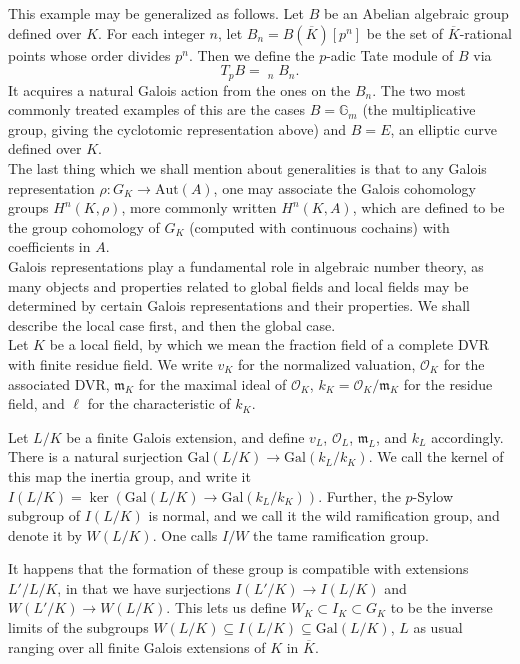 \documentclass[12pt]{article}
\newcommand{\Aut}{\mathrm{Aut}}
\newcommand{\calO}{\mathcal{O}}
\newcommand{\cn}{\colon}
\newcommand{\fkm}{\mathfrak{m}}
\newcommand{\Gal}{\mathrm{Gal}}
\newcommand{\ov}[1]{\overline{#1}}
\newcommand{\liminv}{\mathop{\lim_{\longleftarrow}}}
\begin{document}
This example may be generalized as follows.  Let $B$ be an Abelian algebraic group defined over $K$.  For each integer $n$, let $B_n = B(\ov{K})[p^n]$ be the set of $\ov{K}$-rational points whose order divides $p^n$.  Then we define the $p$-adic Tate module of $B$ via
\[
T_pB = \liminv_n B_n.
\]
It acquires a natural Galois action from the ones on the $B_n$.  The two most commonly treated examples of this are the cases $B = \mathbb{G}_m$ (the multiplicative group, giving the cyclotomic representation above) and $B = E$, an elliptic curve defined over $K$.\\


The last thing which we shall mention about generalities is that to any Galois representation $\rho \cn G_K \to \Aut(A)$, one may associate the Galois cohomology groups $H^n(K,\rho)$, more commonly written $H^n(K,A)$, which are defined to be the group cohomology of $G_K$ (computed with continuous cochains) with coefficients in $A$.\\


Galois representations play a fundamental role in algebraic number theory, as many objects and properties related to global fields and local fields may be determined by certain Galois representations and their properties.  We shall describe the local case first, and then the global case.\\


Let $K$ be a local field, by which we mean the fraction field of a complete DVR with finite residue field.  We write $v_K$ for the normalized valuation, $\calO_K$ for the associated DVR, $\fkm_K$ for the maximal ideal of $\calO_K$, $k_K = \calO_K/\fkm_K$ for the residue field, and $\ell$ for the characteristic of $k_K$.

Let $L/K$ be a finite Galois extension, and define $v_L$, $\calO_L$, $\fkm_L$, and $k_L$ accordingly.  There is a natural surjection $\Gal(L/K) \to \Gal(k_L/k_K)$.  We call the kernel of this map the inertia group, and write it $I(L/K) = \ker(\Gal(L/K) \to \Gal(k_L/k_K))$.  Further, the $p$-Sylow subgroup of $I(L/K)$ is normal, and we call it the wild ramification group, and denote it by $W(L/K)$.  One calls $I/W$ the tame ramification group.

It happens that the formation of these group is compatible with extensions $L'/L/K$, in that we have surjections $I(L'/K) \to I(L/K)$ and $W(L'/K) \to W(L/K)$.  This lets us define $W_K \subset I_K \subset G_K$ to be the inverse limits of the subgroups $W(L/K) \subseteq I(L/K) \subseteq \Gal(L/K)$, $L$ as usual ranging over all finite Galois extensions of $K$ in $\ov{K}$.
\end{document}
